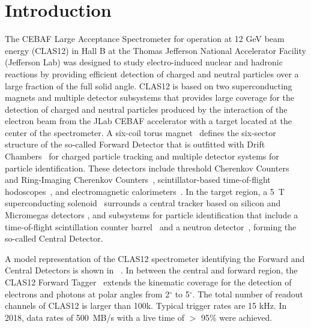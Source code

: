\section{Introduction}

The CEBAF Large Acceptance Spectrometer for operation at 12 GeV beam energy (CLAS12) \cite{clas12-nim} in Hall B at
the Thomas Jefferson National Accelerator Facility (Jefferson Lab) was designed to study
electro-induced nuclear and hadronic reactions by providing efficient detection of charged and neutral particles over a large
fraction of the full solid angle.
CLAS12 is based on two superconducting magnets and multiple detector subsystems that provides large
coverage for the detection of charged and neutral particles produced by the interaction of the electron beam
from the JLab CEBAF accelerator with a target located at the center of the spectrometer. A six-coil torus
magnet~\cite{magnets-nim} defines the six-sector structure of the so-called Forward Detector that is outfitted with Drift
Chambers~\cite{dc-nim} for charged particle tracking and multiple detector systems for particle identification.
These detectors include threshold Cherenkov Counters~\cite{ltcc-nim, htcc-nim} and Ring-Imaging Cherenkov
Counters~\cite{rich-nim}, scintillator-based time-of-flight hodoscopes~\cite{ftof-nim}, and electromagnetic
calorimeters~\cite{ec-nim}. In the target region, a 5~T superconducting solenoid~\cite{magnets-nim} surrounds a central tracker
based on silicon and Micromegas detectors \cite{svt-nim,mm-nim}, and subsystems for particle identification
that include a time-of-flight scintillation counter barrel~\cite{ctof-nim} and a neutron detector~\cite{cnd-nim},
forming the so-called Central Detector.

A model representation of the CLAS12 spectrometer identifying the Forward
and Central Detectors is shown in ~. In between the central and forward region, the CLAS12 Forward Tagger~\cite{ft-nim}
extends the kinematic coverage for the detection of electrons and photons at polar angles from 2$^\circ$ to
5$^\circ$. The total number of
readout channels of CLAS12 is larger than 100k. Typical trigger rates are 15 kHz. In 2018, data rates of
500~MB/s with a live time of $>$ 95\% were achieved.

